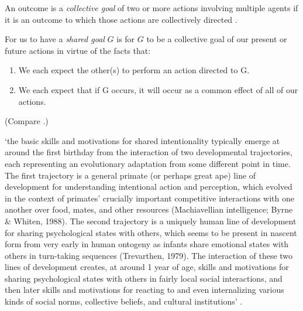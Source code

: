 \documentclass[12pt]{extarticle}
\begin{document}
\begin{multicols}{3}
An outcome is a \emph{collective goal} of two or more actions involving multiple
agents if it is an outcome to which those actions are collectively directed \citep{butterfill:2016_minimal}.

For us to have a \emph{shared goal} $G$ is for $G$ to be a collective goal
of our present or future actions in virtue of the facts that:
\begin{enumerate}
\item We each expect the other(s) to perform an action directed to G.
\item We each expect that if G occurs, it will occur as a common effect of all of our actions.
\end{enumerate}
(Compare \citealp{Butterfill:2011fk,vesper_minimal_2010}.)

‘the basic skills and motivations for shared intentionality typically emerge
at around the first birthday from the interaction of two developmental
trajectories, each representing an evolutionary adaptation from some
different point in time.
The first trajectory is a general primate (or
perhaps great ape) line of development for understanding intentional action
and perception, which evolved in the context of primates’ crucially important
competitive interactions with one another over food, mates, and other
resources (Machiavellian intelligence; Byrne \& Whiten, 1988).
The second
trajectory is a uniquely human line of development for sharing psychological
states with others, which seems to be present in nascent form from very early
in human ontogeny as infants share emotional states with others in
turn-taking sequences (Trevarthen, 1979). The interaction of these two lines
of development creates, at around 1 year of age, skills and motivations for
sharing psychological states with others in fairly local social interactions,
and then later skills and motivations for reacting to and even internalizing
various kinds of social norms, collective beliefs, and cultural institutions’
\citep[p~124]{Tomasello:2007gl}.
 


\footnotesize


\end{multicols}
\end{document}
